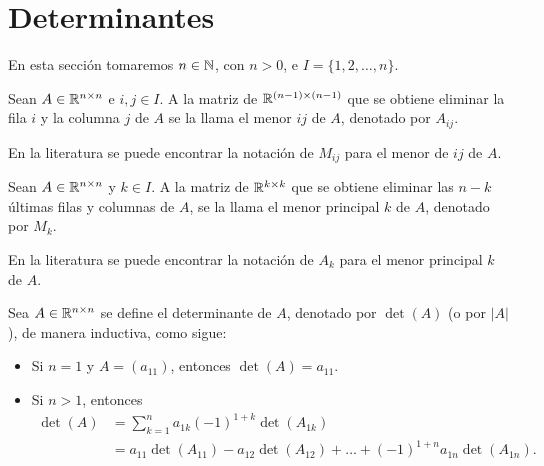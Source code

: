 \documentclass[a4,11pt]{aleph-notas}
\begin{document}
\encabezado

\section{Determinantes}

En esta sección tomaremos $n\in \N$, con $n>0$, e $I = \{ 1, 2, \ldots, n\}$.

\begin{defi}[Menor]
    Sean $A\in \Mat[\R]{n}{n}$ e $i,j\in I$. A la matriz de $\Mat[\R]{(n-1)}{(n-1)}$ que se obtiene eliminar la fila $i$ y la columna $j$ de $A$ se la llama el menor $ij$ de $A$, denotado por $A_{ij}$.
\end{defi}

\begin{advertencia}
    En la literatura se puede encontrar la notación de $M_{ij}$ para el menor de $ij$ de $A$.
\end{advertencia}

\begin{defi}
    Sean $A\in \Mat[\R]{n}{n}$ y $k\in I$. A la matriz de $\Mat[\R]{k}{k}$ que se obtiene eliminar las $n-k$ últimas filas y columnas de $A$, se la llama el menor principal $k$ de $A$, denotado por $M_{k}$.
\end{defi}

\begin{advertencia}
    En la literatura se puede encontrar la notación de $A_{k}$ para el menor principal $k$ de $A$.
\end{advertencia}


\begin{defi}[Determinantes] 
    Sea $A\in \Mat[\R]{n}{n}$ se define el determinante de $A$, denotado por $\det(A)$ (o por $|A|$), de manera inductiva, como sigue:
    \begin{itemize}
    \item 
        Si $n=1$ y $A=(a_{11})$, entonces $\det(A) = a_{11}$.
    \item
        Si $n>1$, entonces
        \begin{align*}
            \det(A) 
            & = \sum_{k=1}^n a_{1k}(-1)^{1+k}\det(A_{1k})\\
            & = a_{11}\det(A_{11}) - a_{12}\det(A_{12}) 
            + \ldots +  (-1)^{1+n} a_{1n}\det(A_{1n}).
        \end{align*}
    \end{itemize}
\end{defi}
\end{document}
